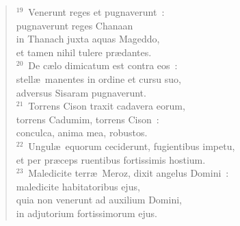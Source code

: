 \begin{verse}${}^{19}$~Venerunt reges et pugnaverunt~:\\ pugnaverunt reges Chanaan\\ in Thanach juxta aquas Mageddo,\\ et tamen nihil tulere pr\ae dantes.\\
${}^{20}$~De c\ae lo dimicatum est contra eos~:\\ stell\ae\ manentes in ordine et cursu suo,\\ adversus Sisaram pugnaverunt.\\
${}^{21}$~Torrens Cison traxit cadavera eorum,\\ torrens Cadumim, torrens Cison~:\\ conculca, anima mea, robustos.\\
${}^{22}$~Ungul\ae\ equorum ceciderunt, fugientibus impetu,\\ et per pr\ae ceps ruentibus fortissimis hostium.\\
${}^{23}$~Maledicite terr\ae\ Meroz, dixit angelus Domini~:\\ maledicite habitatoribus ejus,\\ quia non venerunt ad auxilium Domini,\\ in adjutorium fortissimorum ejus.\end{verse}


